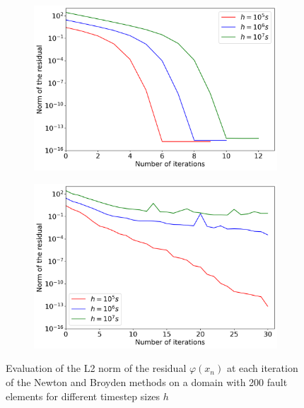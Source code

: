 \begin{figure}[H]
	\centering
	\begin{subfigure}{0.45\textwidth}
		\centering
		\includegraphics[width=1\textwidth]{images/NewtonIterationConvergence200Elements_DifferentDT_Analytic.png}
	\end{subfigure}
	\begin{subfigure}{0.45\textwidth}
		\centering
		\includegraphics[width=1\textwidth]{images/NewtonIterationConvergence200Elements_DifferentDT_Broyden.png}
	\end{subfigure}
	\caption{Evaluation of the L2 norm of the residual $\varphi(x_n)$ at each iteration of the Newton and Broyden methods on a domain with 200 fault elements for different timestep sizes $h$}
	\label{fig:convergenceNewtonAndBroydenDifferentTimeSteps}
\end{figure}

